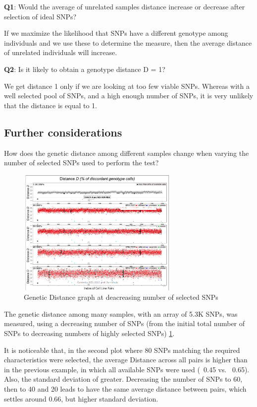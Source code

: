 \textbf{Q1}: Would the average of unrelated samples distance increase or decrease after selection of ideal SNPs?

If we maximize the likelihood that SNPs have a different genotype among individuals and we use these to determine the measure, then the average distance of unrelated individuals will increase.

\textbf{Q2}: Is it likely to obtain a genotype distance D = 1?

We get distance 1 only if we are looking at too few viable SNPs. Whereas with a well selected pool of SNPs, and a high enough number of SNPs, it is very unlikely that the distance is equal to 1.

\subsection{Further considerations}
How does the genetic distance among different samples change when varying the number of selected SNPs used to perform the test?

\begin{figure}
	\centering
	\includegraphics[width=0.7\textwidth]{selected.PNG}
	\caption{\label{fig:sel_snp}Genetic Distance graph at deacreasing number of selected SNPs}
\end{figure}

The genetic distance among many samples, with an array of 5.3K SNPs, was measured, using a decreasing number of SNPs (from the initial total number of SNPs to decreasing numbers of highly selected SNPs) \ref{fig:sel_snp}. 

It is noticeable that, in the second plot where 80 SNPs matching the required characteristics were selected, the average Distance across all pairs is higher than in the previous example, in which all available SNPs were used (~0.45 vs. ~0.65). Also, the standard deviation of greater. 
Decreasing the number of SNPs to 60, then to 40 and 20 leads to have the same average distance between pairs, which settles around 0.66, but higher standard deviation.

